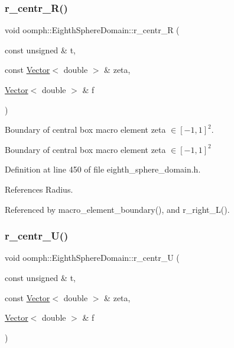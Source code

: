 \subsubsection{\texorpdfstring{r\+\_\+centr\+\_\+\+R()}{r\_centr\_R()}}
{\footnotesize\ttfamily void oomph\+::\+Eighth\+Sphere\+Domain\+::r\+\_\+centr\+\_\+R (\begin{DoxyParamCaption}\item[{const unsigned \&}]{t,  }\item[{const \hyperlink{classoomph_1_1Vector}{Vector}$<$ double $>$ \&}]{zeta,  }\item[{\hyperlink{classoomph_1_1Vector}{Vector}$<$ double $>$ \&}]{f }\end{DoxyParamCaption})\hspace{0.3cm}{\ttfamily [private]}}



Boundary of central box macro element zeta $ \in [-1,1]^2 $. 

Boundary of central box macro element zeta $ \in [-1,1]^2 $ 

Definition at line 450 of file eighth\+\_\+sphere\+\_\+domain.\+h.



References Radius.



Referenced by macro\+\_\+element\+\_\+boundary(), and r\+\_\+right\+\_\+\+L().

\mbox{\label{classoomph_1_1EighthSphereDomain_afda0d6220482758cc0ad81ea848de45b}} 
\subsubsection{\texorpdfstring{r\+\_\+centr\+\_\+\+U()}{r\_centr\_U()}}
{\footnotesize\ttfamily void oomph\+::\+Eighth\+Sphere\+Domain\+::r\+\_\+centr\+\_\+U (\begin{DoxyParamCaption}\item[{const unsigned \&}]{t,  }\item[{const \hyperlink{classoomph_1_1Vector}{Vector}$<$ double $>$ \&}]{zeta,  }\item[{\hyperlink{classoomph_1_1Vector}{Vector}$<$ double $>$ \&}]{f }\end{DoxyParamCaption})\hspace{0.3cm}{\ttfamily [private]}}



